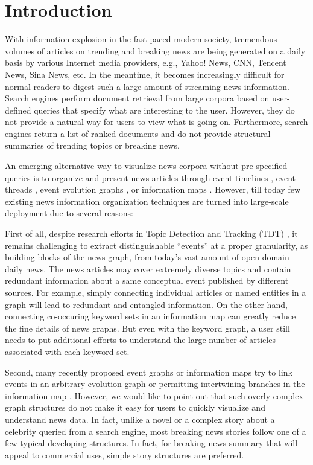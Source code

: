 \section{Introduction}
\label{sec:intro}


With information explosion in the fast-paced modern society, tremendous volumes of articles on trending and breaking news are being generated on a daily basis by various Internet media providers, e.g., Yahoo! News, CNN, Tencent News, Sina News, etc. In the meantime, it becomes increasingly difficult for normal readers to digest such a large amount of streaming news information. Search engines perform document retrieval from large corpora based on user-defined queries that specify what are interesting to the user. However, they do not provide a natural way for users to view what is going on. Furthermore, search engines return a list of ranked documents and do not provide structural summaries of trending topics or breaking news.

An emerging alternative way to visualize news corpora without pre-specified queries is to organize and present news articles through event timelines \cite{yan2011evolutionary,  wang2016socially}, event threads \cite{nallapati2004event}, event evolution graphs \cite{yang2009discovering}, or information maps \cite{shahaf2012trains,shahaf2013information,xu2013summarizing}. However, till today few existing news information organization techniques are turned into large-scale deployment due to several reasons:

First of all, despite research efforts in Topic Detection and Tracking (TDT) \cite{yang2002multi, allan1998line}, it remains challenging to extract distinguishable ``events'' at a proper granularity, as building blocks of the news graph, from today's vast amount of open-domain daily news. The news articles may cover extremely diverse topics and contain redundant information about a same conceptual event published by different sources. For example, simply connecting individual articles \cite{shahaf2012trains} or named entities \cite{faloutsos2004fast} in a graph will lead to redundant and entangled information. On the other hand, connecting co-occuring keyword sets in an information map \cite{shahaf2013information} can greatly reduce the fine details of news graphs. But even with the keyword graph, a user still needs to put additional efforts to understand the large number of articles associated with each keyword set.    

Second, many recently proposed event graphs or information maps try to link events in an arbitrary evolution graph \cite{yang2009discovering} or permitting intertwining branches in the information map \cite{shahaf2013information}. However, we would like to point out that such overly complex graph structures do not make it easy for users to quickly visualize and understand news data. In fact, unlike a novel or a complex story about a celebrity queried from a search engine, most breaking news stories follow one of a few typical developing structures. In fact, for breaking news summary that will appeal to commercial uses, simple story structures are preferred.

